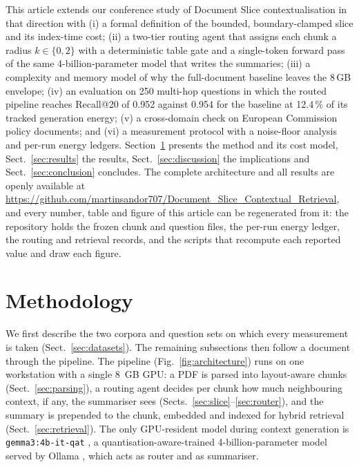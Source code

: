 \documentclass[pdflatex,sn-mathphys-num]{sn-jnl}
\makeatletter
\newcommand{\Rec}[1]{Recall@#1}
\theoremstyle{thmstyleone}%
\theoremstyle{thmstylethree}%
\makeatother
\begin{document}
This article extends our conference study of Document Slice contextualisation \cite{sandor2025documentslicecontextualretrieval} in that direction with (i) a formal definition of the bounded, boundary-clamped slice and its index-time cost; (ii) a two-tier routing agent that assigns each chunk a radius $k\in\{0,2\}$ with a deterministic table gate and a single-token forward pass of the same 4-billion-parameter model that writes the summaries; (iii) a complexity and memory model of why the full-document baseline leaves the 8\,GB envelope; (iv) an evaluation on 250 multi-hop questions in which the routed pipeline reaches \Rec{20} of 0.952 against 0.954 for the baseline at 12.4\,\% of its tracked generation energy; (v) a cross-domain check on European Commission policy documents; and (vi) a measurement protocol with a noise-floor analysis and per-run energy ledgers. Section~\ref{sec:method} presents the method and its cost model, Sect.~\ref{sec:results} the results, Sect.~\ref{sec:discussion} the implications and Sect.~\ref{sec:conclusion} concludes. The complete architecture and all results are openly available at \url{https://github.com/martinsandor707/Document_Slice_Contextual_Retrieval}, and every number, table and figure of this article can be regenerated from it: the repository holds the frozen chunk and question files, the per-run energy ledger, the routing and retrieval records, and the scripts that recompute each reported value and draw each figure.

\section{Methodology}\label{sec:method}

We first describe the two corpora and question sets on which every measurement is taken (Sect.~\ref{sec:datasets}). The remaining subsections then follow a document through the pipeline. The pipeline (Fig.~\ref{fig:architecture}) runs on one workstation with a single 8\, GB GPU: a PDF is parsed into layout-aware chunks (Sect.~\ref{sec:parsing}), a routing agent decides per chunk how much neighbouring context, if any, the summariser sees (Sects.~\ref{sec:slice}--\ref{sec:router}), and the summary is prepended to the chunk, embedded and indexed for hybrid retrieval (Sect.~\ref{sec:retrieval}). The only GPU-resident model during context generation is \texttt{gemma3:4b-it-qat} \cite{gemma3report2025}, a quantisation-aware-trained 4-billion-parameter model served by Ollama \cite{ollama}, which acts as router and as summariser.
\end{document}
